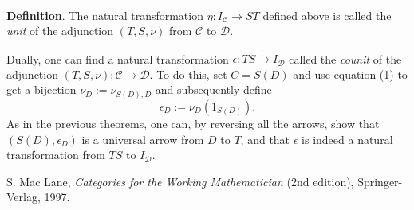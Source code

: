 \documentclass[12pt]{article}
\begin{document}
\textbf{Definition}.  The natural transformation $\eta:I_{\mathcal{C}}\dot{\to} ST$ defined above is called the \emph{unit} of the adjunction $(T,S,\nu)$ from $\mathcal{C}$ to $\mathcal{D}$.

Dually, one can find a natural transformation $\epsilon:TS \dot{\to} I_{\mathcal{D}}$ called the \emph{counit} of the adjunction $(T,S,\nu):\mathcal{C}\to\mathcal{D}$.  To do this, set $C=S(D)$ and use equation (1) to get a bijection $\nu_D:=\nu_{S(D),D}$ and subsequently define 
\begin{equation}
\epsilon_D:=\nu_D(1_{S(D)}).
\end{equation}
As in the previous theorems, one can, by reversing all the arrows, show that $(S(D),\epsilon_D)$ is a universal arrow from $D$ to $T$, and that $\epsilon$ is indeed a natural transformation from $TS$ to $I_{\mathcal{D}}$.

\begin{thebibliography}{9}
S. Mac Lane, \emph{Categories for the Working Mathematician} (2nd edition), Springer-Verlag, 1997.
\end{thebibliography}
\end{document}
